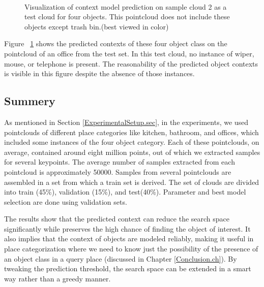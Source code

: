 \begin{figure} [htp]
\begin{center}
     \\
  \end{center}
  \caption[Visualization of context model prediction on sample cloud 2 as a test cloud.]
  {Visualization of context model prediction on sample cloud 2 as a test cloud for four objects. This pointcloud does not include 
  these objects except trash bin.(best viewed in color)}
  \label{ContextPrediction_Test_512.figure:edge}
\end{figure}

Figure ~\ref{ContextPrediction_Test_512.figure:edge} shows the predicted contexts of these four object class on the 
pointcloud of an office from the test set.
In this test cloud, no instance of wiper, mouse, or telephone is present.
The reasonability of the predicted object contexts is visible in this figure despite the absence of those instances.

\subsection*{Summery}
As mentioned in Section \ref{ExperimentalSetup.sec}, in the experiments, we used pointclouds of different place categories like 
kitchen, bathroom, and offices, which included some instances of the four object category.
Each of these pointclouds, on average, contained around eight million points, out of which we extracted samples for several keypoints.
The average number of samples extracted from each pointcloud is approximately 50000.
Samples from several pointclouds are assembled in a set from which a train set is derived.
The set of clouds are divided into train (45\%), validation (15\%), and test(40\%).
Parameter and best model selection are done using validation sets.

The results show that the predicted context can reduce the search space significantly while preserves the high chance of
finding the object of interest.
It also implies that the context of objects are modeled reliably, making it useful in place categorization where
we need to know just the possibility of the presence of an object class in a query place (discussed in Chapter \ref{Conclusion.ch}). 
By tweaking the prediction threshold, the search space can be extended in a smart way rather than a greedy manner.

